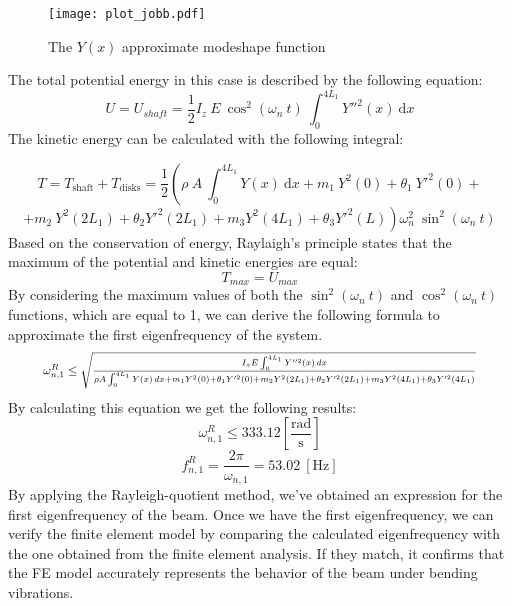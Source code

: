 \documentclass[12pt]{article}
\begin{document}
\begin{figure}[H]
\centering
\texttt{[image: plot\_jobb.pdf]}
\caption{The $Y(x)$ approximate modeshape function}
\end{figure}


The total potential energy in this case is described by the following equation:
\begin{equation}
U = U_{shaft} = \frac{1}{2} I_z ~ E ~ \cos^2 \left( \omega_n ~ t \right) ~ \int_0^{4L_1}  Y''^2 (x)~\text{d}x
\end{equation}
The kinetic energy can be calculated with the following integral:

\begin{equation}
T = T_{\text{shaft}} + T_{\text{disks}} = \frac{1}{2} \left( \rho ~ A ~\int_0^{4L_1}  Y(x) ~\text{d}x + m_1 ~ Y^2(0)+ \theta_1 ~ Y'^2(0)+ \right.
\end{equation}
\vspace{-0.3cm}
\begin{equation*}
\left. +m_2 ~ Y^2(2L_1) + \theta_2 Y'^2(2L_1)+ m_3 Y^2 (4L_1) + \theta_3 Y'^2(L)\right) \omega_n^2 ~ \sin^2\left(\omega_n ~ t \right)
\end{equation*}
Based on the conservation of energy, Raylaigh’s principle states that the maximum of the potential and kinetic energies are equal:
\begin{equation}
T_{max} = U_{max}
\end{equation}
By considering the maximum values of both the $\sin^2(\omega_n~ t)$ and $\cos^2(\omega_n ~ t)$ functions, which are equal to 1, we can derive the following formula to approximate the first eigenfrequency of the system.
\begin{equation}
\resizebox{0.9\linewidth}{!}{$\omega_{n,1}^R \leq \sqrt{\frac{I_z E \int_0^{4L_1} Y''^2(x) \, dx}{\rho A \int_0^{4L_1} Y(x) \, dx + m_1 Y^2(0) + \theta_1 Y'^2(0) + m_2 Y^2(2L_1) + \theta_2 Y'^2(2L_1) + m_3 Y^2(4L_1) + \theta_3 Y'^2(4L_1)}}$}
\end{equation}
By calculating this equation we get the following results:
\begin{equation}
\omega_{n,1}^R \leq 333.12 \left[ \frac{\text{rad}}{\text{s}} \right]
\end{equation}
\begin{equation}
f_{n,1}^R = \frac{2\pi}{\omega_{n,1}} = 53.02 ~  \left[ \text{Hz} \right]
\end{equation}
By applying the Rayleigh-quotient method, we've obtained an expression for the first eigenfrequency of the beam. Once we have the first eigenfrequency, we can verify the finite element model by comparing the calculated eigenfrequency with the one obtained from the finite element analysis. If they match, it confirms that the FE model accurately represents the behavior of the beam under bending vibrations.
\end{document}
